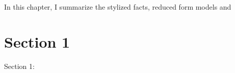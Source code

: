 \minitoc

\vspace{0.5cm}

In this chapter, I summarize the stylized facts, reduced form models and 


\section{Section 1}
Section 1: